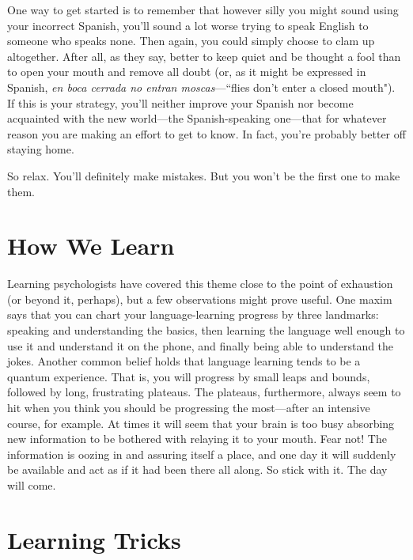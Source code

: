 One way to get started is to remember that however silly you
might sound using your incorrect Spanish, you'll sound a lot worse trying to speak English to someone who speaks none. Then again, you
could simply choose to clam up altogether. After all, as they say, better
to keep quiet and be thought a fool than to open your mouth and remove all doubt (or, as it might be expressed in Spanish, \emph{en boca cerrada no entran moscas}---``flies don't enter a closed mouth"). If this
is your strategy, you'll neither improve your Spanish nor become acquainted with the new world---the Spanish-speaking one---that for
whatever reason you are making an effort to get to know. In fact, you're
probably better off staying home.

So relax. You'll definitely make mistakes. But you won't be the
first one to make them.

\section{How We Learn}

Learning psychologists have covered this theme close to the
point of exhaustion (or beyond it, perhaps), but a few observations
might prove useful. One maxim says that you can chart your language-learning progress by three landmarks: speaking and understanding the
basics, then learning the language well enough to use it and understand it on the phone, and finally being able to understand the jokes.
Another common belief holds that language learning tends to be a
quantum experience. That is, you will progress by small leaps and
bounds, followed by long, frustrating plateaus. The plateaus, furthermore, always seem to hit when you think you should be progressing
the most---after an intensive course, for example. At times it will
seem that your brain is too busy absorbing new information to be
bothered with relaying it to your mouth. Fear not! The information is
oozing in and assuring itself a place, and one day it will suddenly be
available and act as if it had been there all along. So stick with it. The
day will come.

\section{Learning Tricks}

